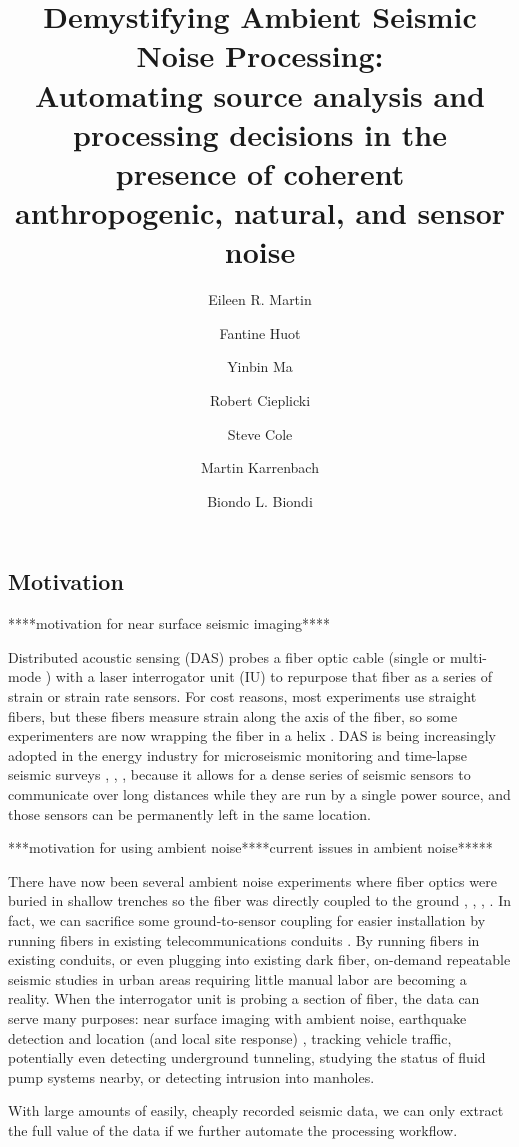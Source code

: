 \documentclass[11pt]{article}
\title{\vspace{-1.8cm} \Large Demystifying Ambient Seismic Noise Processing: \\Automating source analysis and processing decisions in the presence of coherent anthropogenic, natural, and sensor noise \vspace{-0.5cm}}
\author[1,2]{\small Eileen R. Martin}
\author[2]{Fantine Huot}
\author[1]{Yinbin Ma}
\author[2]{Robert Cieplicki}
\author[3]{Steve Cole}
\author[3]{Martin Karrenbach}
\author[1,2]{Biondo L. Biondi \vspace{-0.4cm}}
\affil[1]{Institute for Computational and Mathematical Engineering, Stanford University, Stanford, CA}
\affil[2]{Department of Geophysics, Stanford University, Stanford, CA}
\affil[3]{OptaSense, Brea, CA}
\date{}
\begin{document}
\maketitle

\vspace{-1.8cm}
\subsection*{Motivation} 
\vspace{-0.2cm}
****motivation for near surface seismic imaging****
\par
Distributed acoustic sensing (DAS) probes a fiber optic cable (single or multi-mode \cite{Miller2016}) with a laser interrogator unit (IU) to repurpose that fiber as a series of strain or strain rate sensors. For cost reasons, most experiments use straight fibers, but these fibers measure strain along the axis of the fiber, so some experimenters are now wrapping the fiber in a helix \cite{Kuvshinov2016}. DAS is being increasingly adopted in the energy industry for microseismic monitoring \cite{Webster2013} and time-lapse seismic surveys \cite{Daley2013}, \cite{Mateeva2014}, \cite{Bakku2015}, \cite{Miller2016} because it allows for a dense series of seismic sensors to communicate over long distances while they are run by a single power source, and those sensors can be permanently left in the same location.
\par
***motivation for using ambient noise****current issues in ambient noise*****
\par
There have now been several ambient noise experiments where fiber optics were buried in shallow trenches so the fiber was directly coupled to the ground \cite{AjoFranklin2015}, \cite{Martin2015}, \cite{Martin2016}, \cite{Zeng2017}. In fact, we can sacrifice some ground-to-sensor coupling for easier installation by running fibers in existing telecommunications conduits \cite{Martin2017}. By running fibers in existing conduits, or even plugging into existing dark fiber, on-demand repeatable seismic studies in urban areas requiring little manual labor are becoming a reality. When the interrogator unit is probing a section of fiber, the data can serve many purposes: near surface imaging with ambient noise, earthquake detection and location (and local site response) \cite{Martin2017}, tracking vehicle traffic, potentially even detecting underground tunneling, studying the status of fluid pump systems nearby, or detecting intrusion into manholes. 
\par
With large amounts of easily, cheaply recorded seismic data, we can only extract the full value of the data if we further automate the processing workflow.
\end{document}
